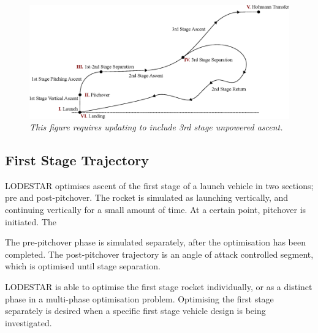 \begin{figure}
\centering
\includegraphics[width=1.\linewidth]{figures/4_LODESTAR/Traj}
\caption{\textit{This figure requires updating to include 3rd stage unpowered ascent.}}
\label{fig:Traj}
\end{figure}


\subsection{First Stage Trajectory}



LODESTAR optimises ascent of the first stage of a launch vehicle in two sections; pre and post-pitchover. The rocket is simulated as launching vertically, and continuing vertically for a small amount of time. At a certain point, pitchover is initiated. The 

The pre-pitchover phase is simulated separately, after the optimisation has been completed. 
The post-pitchover trajectory is an angle of attack controlled segment, which is optimised until stage separation.


LODESTAR is able to optimise the first stage rocket individually, or as a distinct phase in a multi-phase optimisation problem. 
Optimising the first stage separately is desired when a specific first stage vehicle design is being investigated. 



